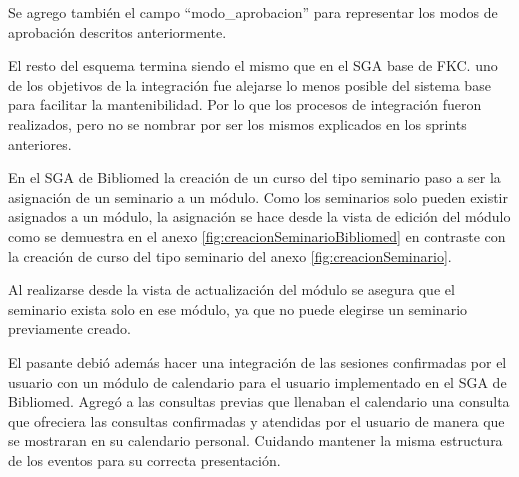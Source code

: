 	Se agrego también el campo ``modo\_aprobacion'' para representar los modos de aprobación descritos anteriormente.

	El resto del esquema termina siendo el mismo que en el SGA base de FKC. uno de los objetivos de la integración fue alejarse lo menos posible del sistema base para facilitar la mantenibilidad. Por lo que los procesos de integración fueron realizados, pero no se nombrar por ser los mismos explicados en los sprints anteriores.

	En el SGA de Bibliomed la creación de un curso del tipo seminario paso a ser la asignación de un seminario a un módulo. Como los seminarios solo pueden existir asignados a un módulo, la asignación se hace desde la vista de edición del módulo como se demuestra en el anexo \ref{fig:creacionSeminarioBibliomed} en contraste con la creación de curso del tipo seminario del anexo \ref{fig:creacionSeminario}.

	Al realizarse desde la vista de actualización del módulo se asegura que el seminario exista solo en ese módulo, ya que no puede elegirse un seminario previamente creado.

	El pasante debió además hacer una integración de las sesiones confirmadas por el usuario con un módulo de calendario para el usuario implementado en el SGA de Bibliomed. Agregó a las consultas previas que llenaban el calendario una consulta que ofreciera las consultas confirmadas y atendidas por el usuario de manera que se mostraran en su calendario personal. Cuidando mantener la misma estructura de los eventos para su correcta presentación.



